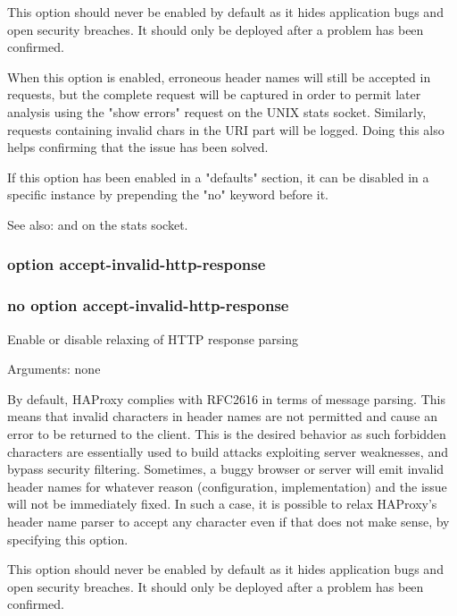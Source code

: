   This option should never be enabled by default as it hides application bugs
  and open security breaches. It should only be deployed after a problem has
  been confirmed.

  When this option is enabled, erroneous header names will still be accepted in
  requests, but the complete request will be captured in order to permit later
  analysis using the "show errors" request on the UNIX stats socket. Similarly,
  requests containing invalid chars in the URI part will be logged. Doing this
  also helps confirming that the issue has been solved.

  If this option has been enabled in a "defaults" section, it can be disabled
  in a specific instance by prepending the "no" keyword before it.

  See also:  and  on the
             stats socket.

\subsubsection{option accept-invalid-http-response}
\subsubsection{no option accept-invalid-http-response}

  
  Enable or disable relaxing of HTTP response parsing


  Arguments: none

  By default, HAProxy complies with RFC2616 in terms of message parsing. This
  means that invalid characters in header names are not permitted and cause an
  error to be returned to the client. This is the desired behavior as such
  forbidden characters are essentially used to build attacks exploiting server
  weaknesses, and bypass security filtering. Sometimes, a buggy browser or
  server will emit invalid header names for whatever reason (configuration,
  implementation) and the issue will not be immediately fixed. In such a case,
  it is possible to relax HAProxy's header name parser to accept any character
  even if that does not make sense, by specifying this option.

  This option should never be enabled by default as it hides application bugs
  and open security breaches. It should only be deployed after a problem has
  been confirmed.

